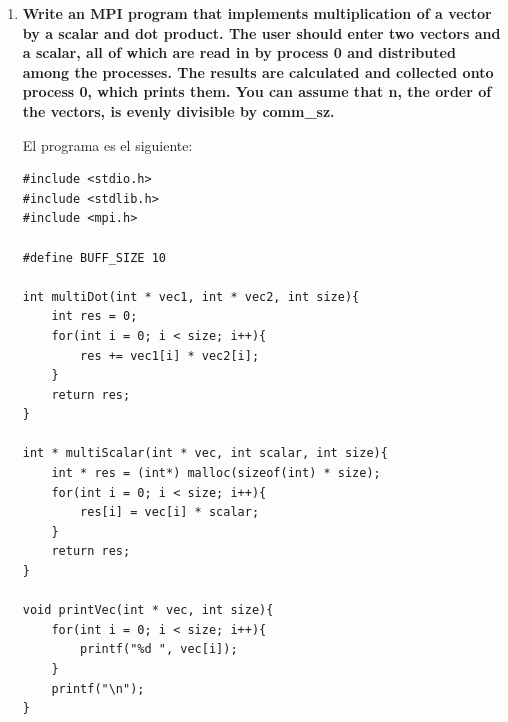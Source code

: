 \documentclass[a4paper,12pt]{article}
\begin{document}
\begin{enumerate}
\item \textbf{Write an MPI program that implements multiplication of a vector by a scalar and dot product. 
The user should enter two vectors and a scalar, all of which are read in by process 0 and distributed among 
the processes. The results are calculated and collected onto process 0, which prints them. You can assume
that n, the order of the vectors, is evenly divisible by comm\_sz.}

El programa es el siguiente:

\begin{lstlisting}
#include <stdio.h>
#include <stdlib.h>
#include <mpi.h>

#define BUFF_SIZE 10

int multiDot(int * vec1, int * vec2, int size){
	int res = 0;
	for(int i = 0; i < size; i++){
		res += vec1[i] * vec2[i];
	}
	return res;
}

int * multiScalar(int * vec, int scalar, int size){
	int * res = (int*) malloc(sizeof(int) * size);
	for(int i = 0; i < size; i++){
		res[i] = vec[i] * scalar;
	}
	return res;
}

void printVec(int * vec, int size){
	for(int i = 0; i < size; i++){
		printf("%d ", vec[i]);
	}
	printf("\n");
}


\end{lstlisting}
\end{enumerate}
\end{document}
